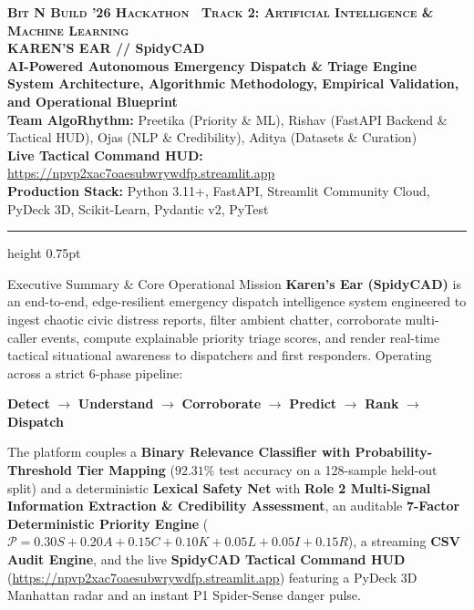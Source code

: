 \documentclass[10pt,a4paper]{article}
\begin{document}
\begin{center}
  {\small\scshape\bfseries\color{SlateBlue}Bit N Build '26 Hackathon \textbar\ Track 2: Artificial Intelligence \& Machine Learning}\\[0.10cm]
  {\LARGE\bfseries\color{DarkNavy} KAREN'S EAR // SpidyCAD}\\[0.05cm]
  {\large\bfseries\color{SlateBlue} AI-Powered Autonomous Emergency Dispatch \& Triage Engine}\\[0.08cm]
  {\small\color{AccentBlue}\textbf{System Architecture, Algorithmic Methodology, Empirical Validation, and Operational Blueprint}}\\[0.10cm]
  {\footnotesize \textbf{Team AlgoRhythm:} Preetika (Priority \& ML), Rishav (FastAPI Backend \& Tactical HUD), Ojas (NLP \& Credibility), Aditya (Datasets \& Curation)}\\[0.04cm]
  {\footnotesize \textbf{Live Tactical Command HUD:} \url{https://npvp2xac7oaesubwrywdfp.streamlit.app}}\\[0.04cm]
  {\footnotesize \textbf{Production Stack:} Python 3.11+, FastAPI, Streamlit Community Cloud, PyDeck 3D, Scikit-Learn, Pydantic v2, PyTest}
\end{center}
\vspace{-0.22cm}
\hrule height 0.75pt
\vspace{0.18cm}

\begin{calloutbox}{Executive Summary \& Core Operational Mission}
\small
\textbf{Karen's Ear (SpidyCAD)} is an end-to-end, edge-resilient emergency dispatch intelligence system engineered to ingest chaotic civic distress reports, filter ambient chatter, corroborate multi-caller events, compute explainable priority triage scores, and render real-time tactical situational awareness to dispatchers and first responders. Operating across a strict 6-phase pipeline:
\begin{center}
  \textbf{\color{DarkNavy} Detect} $\boldsymbol{\longrightarrow}$ 
  \textbf{\color{DarkNavy} Understand} $\boldsymbol{\longrightarrow}$ 
  \textbf{\color{DarkNavy} Corroborate} $\boldsymbol{\longrightarrow}$ 
  \textbf{\color{DarkNavy} Predict} $\boldsymbol{\longrightarrow}$ 
  \textbf{\color{DarkNavy} Rank} $\boldsymbol{\longrightarrow}$ 
  \textbf{\color{DarkNavy} Dispatch}
\end{center}
The platform couples a \textbf{Binary Relevance Classifier with Probability-Threshold Tier Mapping} ($92.31\%$ test accuracy on a 128-sample held-out split) and a deterministic \textbf{Lexical Safety Net} with \textbf{Role 2 Multi-Signal Information Extraction \& Credibility Assessment}, an auditable \textbf{7-Factor Deterministic Priority Engine} ($\mathcal{P} = 0.30S + 0.20A + 0.15C + 0.10K + 0.05L + 0.05I + 0.15R$), a streaming \textbf{CSV Audit Engine}, and the live \textbf{SpidyCAD Tactical Command HUD} (\url{https://npvp2xac7oaesubwrywdfp.streamlit.app}) featuring a PyDeck 3D Manhattan radar and an instant P1 Spider-Sense danger pulse.
\end{calloutbox}
\end{document}
